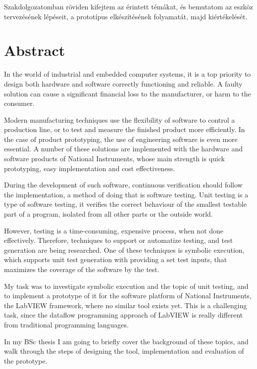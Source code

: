 Szakdolgozatomban röviden kifejtem az érintett témákat, és bemutatom az eszköz tervezésének lépéseit, a prototípus elkészítésének folyamatát, majd kiértékelését.
\vfill
\selectenglish


\chapter*{Abstract}


In the world of industrial and embedded computer systems, it is a top priority to design both hardware and software correctly functioning and reliable. A faulty solution can cause a significant financial loss to the manufacturer, or harm to the consumer. 

Modern manufacturing techniques use the flexibility of software to control a production line, or to test and measure the finished product more efficiently. In the case of product prototyping, the use of engineering software is even more essential. A number of these solutions are implemented with the hardware and software products of National Instruments, whose main strength is quick prototyping, easy implementation and cost effectiveness.

During the development of such software, continuous verification should follow the implementation, a method of doing that is software testing. Unit testing is a type of software testing, it verifies the correct behaviour of the smallest testable part of a program, isolated from all other parts or the outside world.

However, testing is a time-consuming, expensive process, when not done effectively. Therefore, techniques to support or automatize testing, and test generation are being researched. One of these techniques is symbolic execution, which supports unit test generation with providing a set test inputs, that maximizes the coverage of the software by the test.

My task was to investigate symbolic execution and the topic of unit testing, and to implement a prototype of it for the software platform of National Instruments, the LabVIEW framework, where no similar tool exists yet. This is a challenging task, since the dataflow programming approach of LabVIEW is really different from traditional programming languages.

In my BSc thesis I am going to briefly cover the background of these topics, and walk through the steps of designing the tool, implementation and evaluation of the prototype.
\vfill
\selectthesislanguage

\setcounter{romanPage}{\value{page}}
